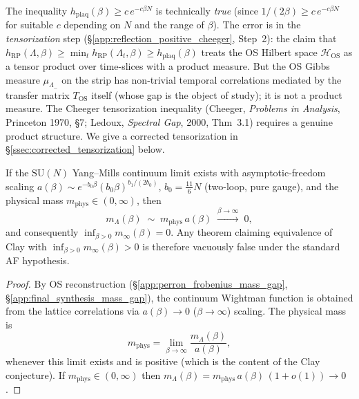 \begin{remark}
\label{rem:exp_bound_usage}
The inequality $h_{\mathrm{plaq}}(\beta)\ge c\,e^{-c\beta N}$
is technically \emph{true} (since $1/(2\beta)\ge c\,e^{-c\beta N}$
for suitable $c$ depending on $N$ and the range of $\beta$). The
error is in the \emph{tensorization} step
(\S\ref{app:reflection_positive_cheeger}, Step~2): the claim that
$h_{\mathrm{RP}}(\Lambda,\beta)\ge\min_{t}h_{\mathrm{RP}}(\Lambda_{t},
\beta)\ge h_{\mathrm{plaq}}(\beta)$ treats the OS Hilbert space
$\mathcal{H}_{\mathrm{OS}}$ as a tensor product over time-slices
with a product measure. But the OS Gibbs measure
$\mu_{\Lambda_{-}}$ on the strip has non-trivial temporal
correlations mediated by the transfer matrix $T_{\mathrm{OS}}$
itself (whose gap is the object of study); it is not a product
measure. The Cheeger tensorization inequality
(Cheeger, \emph{Problems in Analysis}, Princeton 1970, §7;
Ledoux, \emph{Spectral Gap}, 2000, Thm~3.1) requires a genuine product structure.
We give a corrected tensorization in
\S\ref{ssec:corrected_tensorization} below.
\end{remark}

\begin{lemma}
\label{lem:uniform_false}
If the $\mathrm{SU}(N)$ Yang--Mills continuum limit exists with
asymptotic-freedom scaling
$a(\beta)\sim e^{-b_{0}\beta}(b_{0}\beta)^{b_{1}/(2b_{0})}$,
$b_{0}=\tfrac{11}{6}N$ (two-loop, pure gauge), and the physical
mass $m_{\mathrm{phys}}\in(0,\infty)$, then
\[
  m_{\Lambda}(\beta)\;\sim\;m_{\mathrm{phys}}\,a(\beta)
  \;\xrightarrow{\beta\to\infty}\;0,
\]
and consequently $\inf_{\beta>0}m_{\infty}(\beta)=0$. Any theorem
claiming equivalence of Clay with
$\inf_{\beta>0}m_{\infty}(\beta)>0$ is therefore vacuously false
under the standard AF hypothesis.
\end{lemma}

\begin{proof}
By OS reconstruction (\S\ref{app:perron_frobenius_mass_gap},
\S\ref{app:final_synthesis_mass_gap}), the continuum Wightman
function is obtained from the lattice correlations via
$a(\beta)\to0$ ($\beta\to\infty$) scaling. The physical mass is
\[
  m_{\mathrm{phys}}
  =\lim_{\beta\to\infty}\frac{m_{\Lambda}(\beta)}{a(\beta)},
\]
whenever this limit exists and is positive (which is the content
of the Clay conjecture). If $m_{\mathrm{phys}}\in(0,\infty)$ then
$m_{\Lambda}(\beta)=m_{\mathrm{phys}}\,a(\beta)\,(1+o(1))\to0$.
\end{proof}

